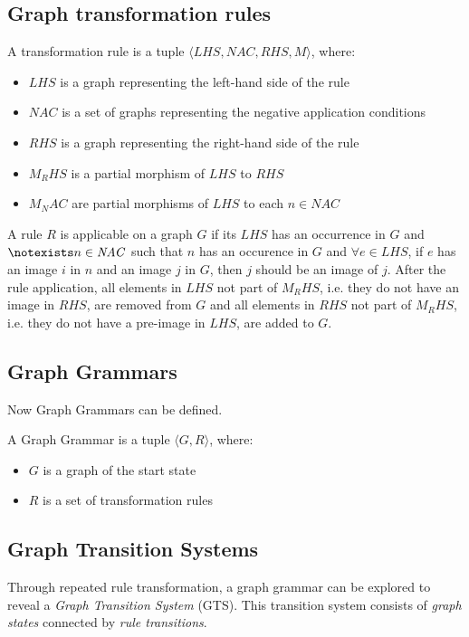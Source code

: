 \subsection{Graph transformation rules}
\begin{definition}
A transformation rule is a tuple $\langle \mathit{LHS}, \mathit{NAC}, \mathit{RHS}, \mathit{M}\rangle$, where:
\begin{itemize}
  \item $\mathit{LHS}$ is a graph representing the left-hand side of the rule
  \item $\mathit{NAC}$ is a set of graphs representing the negative application conditions
  \item $\mathit{RHS}$ is a graph representing the right-hand side of the rule
  \item $\mathit{M_RHS}$ is a partial morphism of $\mathit{LHS}$ to $\mathit{RHS}$ 
  \item $\mathit{M_NAC}$ are partial morphisms of $\mathit{LHS}$ to each $n \in \mathit{NAC}$
\end{itemize}
\end{definition}

A rule $R$ is applicable on a graph $G$ if its $\mathit{LHS}$ has an occurrence in $G$ and $\notexists n \in \mathit{NAC}$ such that $n$ has an occurence in $G$ and $\forall e \in \mathit{LHS}$, if $e$ has an image $i$ in $n$ and an image $j$ in $G$, then $j$ should be an image of $j$. After the rule application, all elements in $\mathit{LHS}$ not part of $\mathit{M_RHS}$, i.e. they do not have an image in $\mathit{RHS}$, are removed from $G$ and all elements in $\mathit{RHS}$ not part of $\mathit{M_RHS}$, i.e. they do not have a pre-image in $\mathit{LHS}$, are added to $G$.

\subsection{Graph Grammars}
Now Graph Grammars can be defined.
\begin{definition}
A Graph Grammar is a tuple $\langle G, R\rangle$, where:
\begin{itemize}
  \item $G$ is a graph of the start state
  \item $R$ is a set of transformation rules
\end{itemize}
\end{definition}

\subsection{Graph Transition Systems}
Through repeated rule transformation, a graph grammar can be explored to reveal a \textit{Graph Transition System} (GTS). This transition system consists of \textit{graph states} connected by \textit{rule transitions}.

